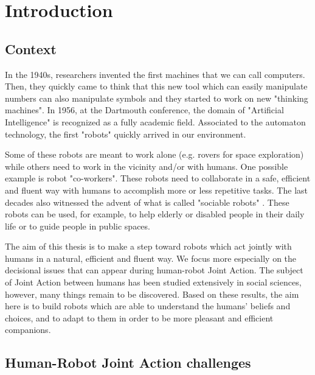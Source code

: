 \documentclass[english,a4paper,11pt,twoside]{StyleThese}
\begin{document}
\dominitoc
\faketableofcontents
\fi


\chapter*{Introduction}
\minitoc

\section*{Context}

In the 1940s, researchers invented the first machines that we can call computers. Then, they quickly came to think that this new tool which can easily manipulate numbers can also manipulate symbols and they started to work on new "thinking machines". In 1956, at the Dartmouth conference, the domain of "Artificial Intelligence" is recognized as a fully academic field. Associated to the automaton technology, the first "robots" quickly arrived in our environment.

Some of these robots are meant to work alone (e.g. rovers for space exploration) while others need to work in the vicinity and/or with humans. One possible example is robot "co-workers". These robots need to collaborate in a safe, efficient and fluent way with humans to accomplish more or less repetitive tasks. The last decades also witnessed the advent of what is called "sociable robots" \cite{dautenhahn2007socially}. These robots can be used, for example, to help elderly or disabled people in their daily life or to guide people in public spaces. 

The aim of this thesis is to make a step toward robots which act jointly with humans in a natural, efficient and fluent way. We focus more especially on the decisional issues that can appear during human-robot Joint Action. The subject of Joint Action between humans has been studied extensively in social sciences, however, many things remain to be discovered. Based on these results, the aim here is to build robots which are able to understand the humans' beliefs and choices, and to adapt to them in order to be more pleasant and efficient companions.

\newpage
\section*{Human-Robot Joint Action challenges}
\end{document}
